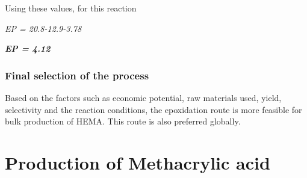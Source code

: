 \documentclass[12pt,a4paper]{report}
\begin{document}
Using these values, for this reaction 
\begin{center}
	\textit{EP = 20.8-12.9-3.78} 
	
	
	\textit{\textbf{EP = 4.12}}
\end{center}		

\subsection{Final selection of the process}
Based on the factors such as economic potential, raw materials used, yield, selectivity and the reaction conditions, the epoxidation route is more feasible for bulk production of HEMA. This route is also preferred globally. 

\chapter{Production of Methacrylic acid}








\end{document}
